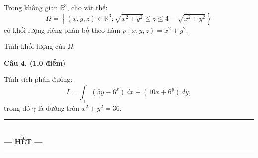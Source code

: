 \vspace{0.3cm}

Trong không gian $\mathbb{R}^3$, cho vật thể:
\[
    \Omega = \left\{ (x, y, z) \in \mathbb{R}^3 : \sqrt{x^2 + y^2} \leq z \leq 4 - \sqrt{x^2 + y^2} \right\}
\]
có khối lượng riêng phân bố theo hàm $\rho(x, y, z) = x^2 + y^2$. 

Tính khối lượng của $\Omega$.

\vspace{0.6cm}
\noindent\textbf{\large Câu 4. (1,0 điểm)}

\vspace{0.3cm}

Tính tích phân đường:
\[
    I = \int_\gamma (5y - 6^x)\,dx + (10x + 6^y)\,dy,
\]
trong đó $\gamma$ là đường tròn $x^2 + y^2 = 36$.

\vspace{1.5cm}
\begin{center}
    \rule{0.5\textwidth}{0.5pt}\\[0.3cm]
    \textbf{\large --- HẾT ---}\\[0.3cm]
    \rule{0.5\textwidth}{0.5pt}
\end{center}

\newpage


